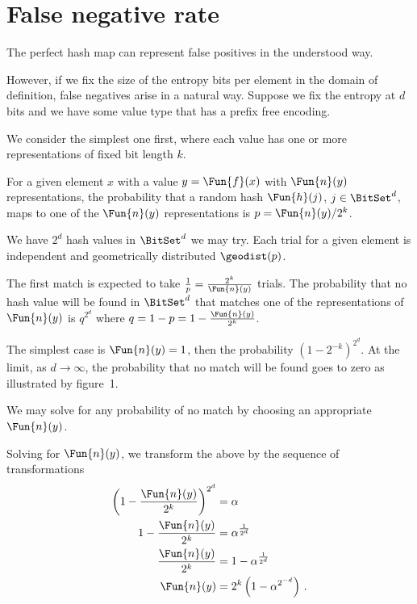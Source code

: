 \documentclass[ ../main.tex]{subfiles}
\begin{document}
\section{False negative rate}
The perfect hash map can represent false positives in the understood way.

However, if we fix the size of the entropy bits per element in the domain of definition, false negatives arise in a natural way. Suppose we fix the entropy at $d$ bits and we have some value type that has a prefix free encoding.

We consider the simplest one first, where each value has one or more representations of fixed bit length $k$.

For a given element $x$ with a value $y = \Fun{f}(x)$ with $\Fun{n}(y)$ representations, the probability that a random hash $\Fun{h}(j)$, $j \in \BitSet^d$, maps to one of the $\Fun{n}(y)$ representations is $p = \Fun{n}(y) / 2^k$.


We have $2^d$ hash values in $\BitSet^d$ we may try. Each trial for a given element is independent and geometrically distributed $\geodist(p)$.

The first match is expected to take $\frac{1}{p} = \frac{2^k}{\Fun{n}(y)}$ trials.
The probability that no hash value will be found in $\BitSet^d$ that matches one of the representations of $\Fun{n}(y)$ is $q^{2^d}$ where $q = 1 - p = 1-\frac{\Fun{n}(y)}{2^k}$.

The simplest case is $\Fun{n}(y) = 1$, then the probability $\left(1-2^{-k}\right)^{2^d}$.
At the limit, as $d \to \infty$, the probability that no match will be found goes to zero as illustrated by figure~1.


We may solve for any probability of no match by choosing an appropriate $\Fun{n}(y)$.



Solving for $\Fun{n}(y)$, we transform the above by the sequence of transformations
\begin{align}
\left(1-\frac{\Fun{n}(y)}{2^k}\right)^{2^d}
&= \alpha\\
1-\frac{\Fun{n}(y)}{2^k}  	&= \alpha^{\frac{1}{2^d}}\\
\frac{\Fun{n}(y)}{2^k}    	&= 1 - \alpha^{\frac{1}{2^d}}\\
\Fun{n}(y)                	&= 2^k\left(1 - \alpha^{2^{-d}}\right)\,.
\end{align}
\end{document}
